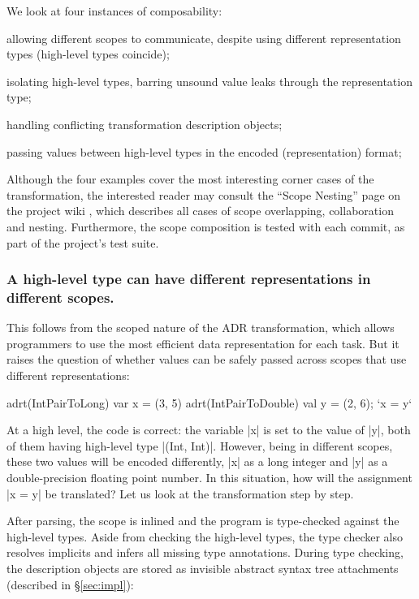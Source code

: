 We look at four instances of composability:

\begin{compactitem}
  \item allowing different scopes to communicate, despite using different representation types (high-level types coincide);
  \item isolating high-level types, barring unsound value leaks through the representation type;
  \item handling conflicting transformation description objects;
  \item passing values between high-level types in the encoded (representation) format;
\end{compactitem}

Although the four examples cover the most interesting corner cases of the transformation, the interested reader may consult the ``Scope Nesting'' page on the project wiki \cite{ildl-plugin-wiki}, which describes all cases of scope overlapping, collaboration and nesting. Furthermore, the scope composition is tested with each commit, as part of the project's test suite.

\subsubsection{A high-level type can have different representations in different scopes.} This follows from the scoped nature of the ADR transformation, which allows programmers to use the most efficient data representation for each task. But it raises the question of whether values can be safely passed across scopes that use different representations:

\begin{lstlisting-nobreak}
adrt(IntPairToLong)   { var x = (3, 5) }
adrt(IntPairToDouble) { val y = (2, 6); `x = y` }
\end{lstlisting-nobreak}

At a high level, the code is correct: the variable |x| is set to the value of |y|, both of them having high-level type |(Int, Int)|. However, being in different scopes, these two values will be encoded differently, |x| as a long integer and |y| as a double-precision floating point number. In this situation, how will the assignment |x = y| be translated? Let us look at the transformation step by step.

After parsing, the scope is inlined and the program is type-checked against the high-level types. Aside from checking the high-level types, the type checker also resolves implicits and infers all missing type annotations. During type checking, the description objects are stored as invisible abstract syntax tree attachments (described in \S\ref{sec:impl}):

